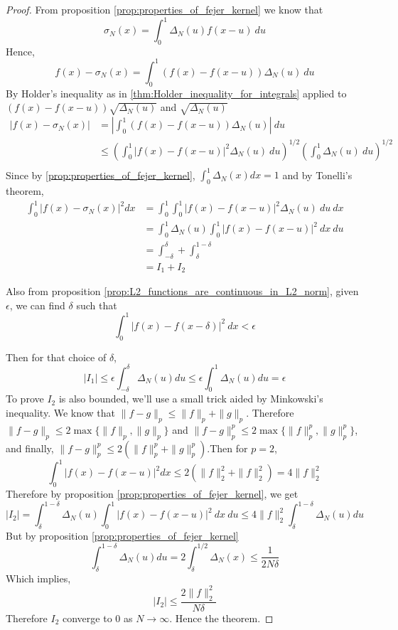 \begin{proof}
  From proposition \ref{prop:properties_of_fejer_kernel} we know that
  \begin{displaymath}
    \sigma_N(x) = \int_0^1 \Delta_N(u)f(x-u) \ du 
  \end{displaymath}
  Hence,
  $$ f(x) - \sigma_N(x) = \int_0^1 (f(x) - f(x-u))\Delta_N(u) \ du $$ 
  By Holder's inequality as in \ref{thm:Holder_inequality_for_integrals} applied to $(f(x) - f(x-u))\sqrt{\Delta_N(u)}$ and $\sqrt{\Delta_N(u)}$ 
  \begin{align*}
    |f(x) - \sigma_N(x)| &= \left| \int_0^1 (f(x) - f(x-u))\Delta_N(u) \right| \ du \\
          &\le \left( \int_0^1 |f(x) - f(x-u)|^{2} \Delta_N(u) \ du \right)^{1/2} \left( \int_0^1 \Delta_N(u) \ du \right)^{1/2} \\
  \end{align*}
  Since by \ref{prop:properties_of_fejer_kernel}, $\int_0^1 \Delta_N(x) dx = 1$ and by Tonelli's theorem, 
  \begin{align*}
    \int_0^1 |f(x) - \sigma_N(x)|^2 dx &= \int_0^1 \int_0^1 |f(x) - f(x-u)|^{2} \Delta_N(u) \ du  \ dx \\
          & = \int_0^1 \Delta_N(u) \int_0^1 |f(x) - f(x-u)|^{2} \ dx  \ du \\
          & = \int_{-\delta}^\delta + \int_\delta^{1-\delta} \\
          & = I_1 + I_2
  \end{align*}

  Also from proposition \ref{prop:L2_functions_are_continuous_in_L2_norm}, given $\epsilon$, we can find $\delta$ such that 
  $$ \int_0^1|f(x) - f(x-\delta)|^2 \ dx < \epsilon$$

  Then for that choice of $\delta$,
  $$|I_1| \le \epsilon \int_{-\delta}^\delta \Delta_N(u) du \le \epsilon \int_0^1 \Delta_N(u) du = \epsilon$$
  To prove $I_2$ is also bounded, we'll use a small trick aided by Minkowski's inequality. We know that $\|f-g\|_p \le \|f\|_p + \|g\|_p$. Therefore $\|f-g\|_p \le 2\max\{\|f\|_p, \|g\|_p\}$ and $\|f-g\|_p^p \le 2\max\{\|f\|_p^p, \|g\|_p^p\}$, and finally, $\|f-g\|_p^p \le 2(\|f\|_p^p + \|g\|_p^p)$.Then for $p=2$, 
  $$ \int_0^1 |f(x) - f(x-u)|^2 dx \le 2(\|f\|_2^2 + \|f\|_2^2) = 4\|f\|_2^2$$
  Therefore by proposition \ref{prop:properties_of_fejer_kernel}, we get 
  $$|I_2| = \int_\delta^{1-\delta} \Delta_N(u) \int_0^1 |f(x) - f(x-u)|^{2} \ dx  \ du \le 4\|f\|_2^2 \int_\delta^{1-\delta}\Delta_N(u) du$$
  But by proposition \ref{prop:properties_of_fejer_kernel} 
  $$ \int_\delta^{1-\delta}\Delta_N(u)du = 2\int_\delta^{1/2}\Delta_N(x) \le \frac{1}{2N\delta}$$
  Which implies, 
  $$ |I_2| \le \frac{2\|f\|_2^2}{N\delta}$$
  Therefore $I_2$ converge to $0$ as $N \to \infty$. Hence the theorem.
\end{proof}

